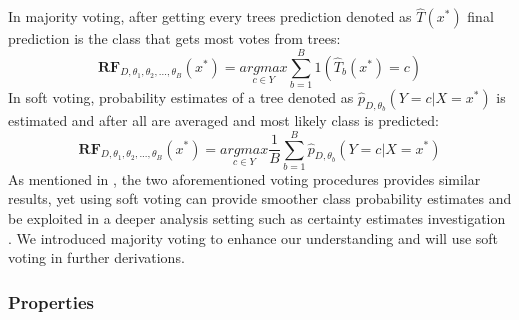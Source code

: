 In majority voting, after getting every trees prediction denoted as $\hat{T}(x^*)$ final prediction is the class that gets most votes from trees:
\begin{equation}
\boldsymbol{RF}_{D, \theta_{1}, \theta_{2}, ..., \theta_{B}} (x^*) =
	\underset{c \in Y}{argmax} \sum_{b = 1}^{B}{1(\hat{T}_{b}(x^*) = c)}
\end{equation}
In soft voting, probability estimates of a tree denoted as $\hat{p}_{D, \theta_{b}} (Y = c | X = x^*)$ is estimated and after all are averaged and most likely class is predicted:
\begin{equation}
\boldsymbol{RF}_{D, \theta_{1}, \theta_{2}, ..., \theta_{B}} (x^*) =
	\underset{c \in Y}{argmax} \dfrac{1}{B}\sum_{b = 1}^{B}{\hat{p}_{D, \theta_{b}} (Y = c | X = x^*)}
\end{equation}
As mentioned in \cite{breiman1996bagging}, the two aforementioned voting procedures provides similar results, 
yet using soft voting can provide smoother class probability estimates and be exploited in a deeper analysis setting such as 
certainty estimates investigation \cite{louppe2014understanding}. 
We introduced majority voting to enhance our understanding and will use soft voting in further derivations. 

\subsubsection{Properties}

